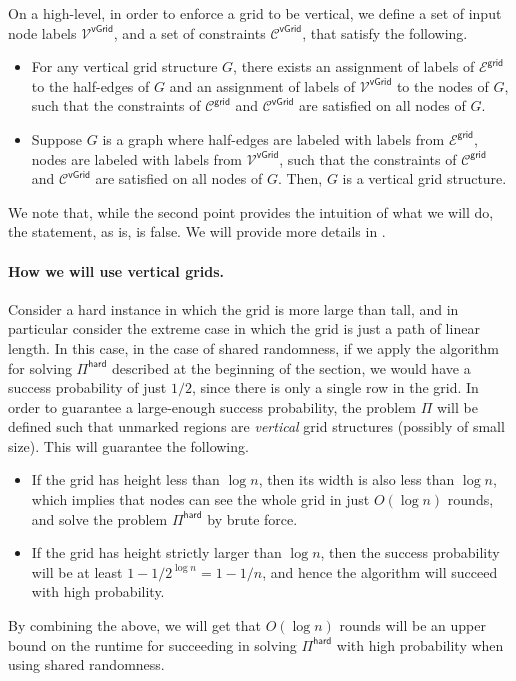\documentclass[11pt]{article}
\newcommand{\lgrid}{\mathsf {grid}}
\newcommand{\lvgrid}{\mathsf {vGrid}}
\newcommand{\lhard}{\mathsf {hard}}
\begin{document}
On a high-level, in order to enforce a grid to be vertical, we define a set of input node labels $\mathcal{V}^{\lvgrid}$, and a set of constraints $\mathcal{C}^{\lvgrid}$, that satisfy the following.
\begin{itemize}
	\item For any vertical grid structure $G$, there exists an assignment of labels of $\mathcal{E}^{\lgrid}$ to the half-edges of $G$ and an assignment of labels of $\mathcal{V}^{\lvgrid}$ to the nodes of $G$, such that the constraints of $\mathcal{C}^{\lgrid}$ and $\mathcal{C}^{\lvgrid}$  are satisfied on all nodes of $G$.
	\item Suppose $G$ is a graph where half-edges are labeled with labels from $\mathcal{E}^{\lgrid}$, nodes are labeled with labels from $\mathcal{V}^{\lvgrid}$, such that  the constraints of $\mathcal{C}^{\lgrid}$ and $\mathcal{C}^{\lvgrid}$  are satisfied on all nodes of $G$. Then, $G$ is a vertical grid structure.
\end{itemize} 
We note that, while the second point provides the intuition of what we will do, the statement, as is, is false. We will provide more details in .


\paragraph{How we will use vertical grids.}
Consider a hard instance in which the grid is more large than tall, and in particular consider the extreme case in which the grid is just a path of linear length. In this case, in the case of shared randomness, if we apply the \local algorithm for solving $\Pi^{\lhard}$ described at the beginning of the section, we would have a success probability of just $1/2$, since there is only a single row in the grid. In order to guarantee a large-enough success probability, the problem $\Pi$ will be defined such that unmarked regions are \emph{vertical} grid structures (possibly of small size). This will guarantee the following.
\begin{itemize}
	\item If the grid has height less than $\log n$, then its width is also less than $\log n$, which implies that nodes can see the whole grid in just $O(\log n)$ rounds, and solve the problem $\Pi^{\lhard}$ by brute force.
	\item If the grid has height strictly larger than $\log n$, then the success probability will be at least $1 - 1/2^{\log n} = 1 - 1/n$, and hence the algorithm will succeed with high probability.
\end{itemize}
By combining the above, we will get that $O(\log n)$ rounds will be an upper bound on the runtime for succeeding in solving $\Pi^{\lhard}$ with high probability when using shared randomness.
\end{document}
